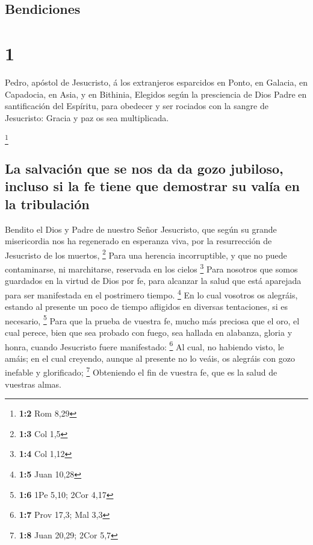 \hypertarget{bendiciones}{%
\subsection{Bendiciones}\label{bendiciones}}

\hypertarget{section}{%
\section{1}\label{section}}

 Pedro, apóstol de Jesucristo, á los extranjeros esparcidos
en Ponto, en Galacia, en Capadocia, en Asia, y en Bithinia, 
Elegidos según la presciencia de Dios Padre en santificación del
Espíritu, para obedecer y ser rociados con la sangre de Jesucristo:
Gracia y paz os sea multiplicada.

\footnote{\textbf{1:2} Rom 8,29}

\hypertarget{la-salvaciuxf3n-que-se-nos-da-da-gozo-jubiloso-incluso-si-la-fe-tiene-que-demostrar-su-valuxeda-en-la-tribulaciuxf3n}{%
\subsection{La salvación que se nos da da gozo jubiloso, incluso si la
fe tiene que demostrar su valía en la
tribulación}\label{la-salvaciuxf3n-que-se-nos-da-da-gozo-jubiloso-incluso-si-la-fe-tiene-que-demostrar-su-valuxeda-en-la-tribulaciuxf3n}}

 Bendito el Dios y Padre de nuestro Señor Jesucristo, que
según su grande misericordia nos ha regenerado en esperanza viva, por la
resurrección de Jesucristo de los muertos, \footnote{\textbf{1:3} Col
  1,5}  Para una herencia incorruptible, y que no puede
contaminarse, ni marchitarse, reservada en los cielos \footnote{\textbf{1:4}
  Col 1,12}  Para nosotros que somos guardados en la virtud
de Dios por fe, para alcanzar la salud que está aparejada para ser
manifestada en el postrimero tiempo. \footnote{\textbf{1:5} Juan 10,28}
 En lo cual vosotros os alegráis, estando al presente un
poco de tiempo afligidos en diversas tentaciones, si es necesario,
\footnote{\textbf{1:6} 1Pe 5,10; 2Cor 4,17}  Para que la
prueba de vuestra fe, mucho más preciosa que el oro, el cual perece,
bien que sea probado con fuego, sea hallada en alabanza, gloria y honra,
cuando Jesucristo fuere manifestado: \footnote{\textbf{1:7} Prov 17,3;
  Mal 3,3}  Al cual, no habiendo visto, le amáis; en el cual
creyendo, aunque al presente no lo veáis, os alegráis con gozo inefable
y glorificado; \footnote{\textbf{1:8} Juan 20,29; 2Cor 5,7} 
Obteniendo el fin de vuestra fe, que es la salud de vuestras almas.

